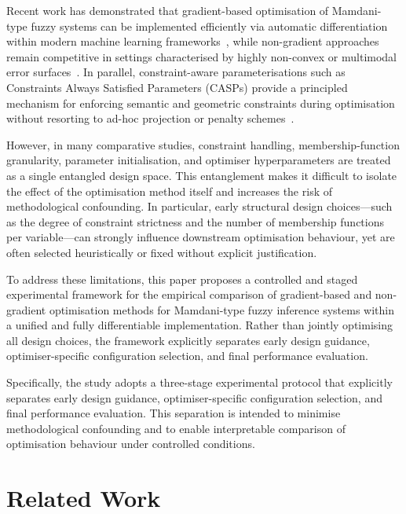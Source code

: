 \documentclass[a4paper,12pt,oneside]{article}
\begin{document}
Recent work has demonstrated that gradient-based optimisation of Mamdani-type
fuzzy systems can be implemented efficiently via automatic differentiation
within modern machine learning frameworks~\cite{chen2024gradient}, while
non-gradient approaches remain competitive in settings characterised by
highly non-convex or multimodal error surfaces~\cite{zhou2023stochastic}.
In parallel, constraint-aware parameterisations such as Constraints Always
Satisfied Parameters (CASPs) provide a principled mechanism for enforcing
semantic and geometric constraints during optimisation without resorting to
ad-hoc projection or penalty schemes~\cite{chen2025casp}.

However, in many comparative studies, constraint handling, membership-function
granularity, parameter initialisation, and optimiser hyperparameters are
treated as a single entangled design space.
This entanglement makes it difficult to isolate the effect of the optimisation
method itself and increases the risk of methodological confounding.
In particular, early structural design choices—such as the degree of
constraint strictness and the number of membership functions per variable—can
strongly influence downstream optimisation behaviour, yet are often selected
heuristically or fixed without explicit justification.

To address these limitations, this paper proposes a controlled and staged
experimental framework for the empirical comparison of gradient-based and
non-gradient optimisation methods for Mamdani-type fuzzy inference systems
within a unified and fully differentiable implementation.
Rather than jointly optimising all design choices, the framework explicitly
separates early design guidance, optimiser-specific configuration selection,
and final performance evaluation.

Specifically, the study adopts a three-stage experimental protocol that
explicitly separates early design guidance, optimiser-specific configuration
selection, and final performance evaluation.
This separation is intended to minimise methodological confounding and to
enable interpretable comparison of optimisation behaviour under controlled
conditions.



\section{Related Work}
\end{document}
